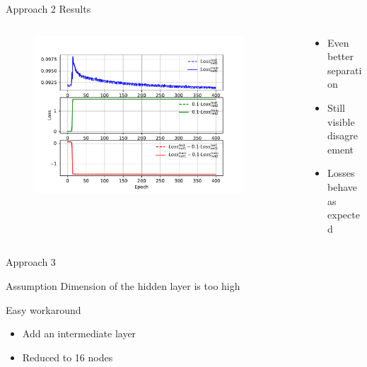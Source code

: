 \begin{frame}{Approach 2 Results}
\begin{figure}[htbp]
    \end{figure}
    \vspace{-0.9cm}
    \begin{columns}
    \begin{column}{0.5\textwidth}
    \begin{figure}
            \includegraphics[width=0.9\textwidth]{app2/app2_losses2.pdf}
    \end{figure}
    \end{column}
    \begin{column}{0.5\textwidth}
    \begin{itemize}
        \item Even better separation
        \item Still visible disagreement
        \item Losses behave as expected
    \end{itemize}
    \end{column}
    \end{columns}
\end{frame}

\begin{frame}{Approach 3}
\begin{block}{Assumption}
    Dimension of the hidden layer is too high
\end{block}
\begin{block}{Easy workaround}
    \begin{itemize}
        \item Add an intermediate layer
        \item Reduced to 16 nodes
    \end{itemize}
\end{block}
\end{frame}

